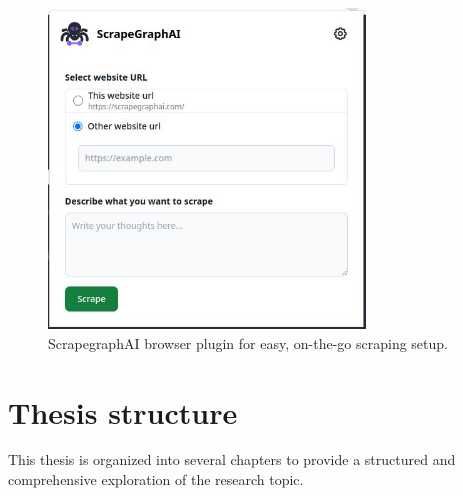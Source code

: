 \begin{figure}[h!]
    \centering
    \includegraphics[width=0.75\textwidth]{Assets/tool.jpg}
    \caption{ScrapegraphAI browser plugin for easy, on-the-go scraping setup.}
    \label{fig:browser-plugin}
\end{figure}

\newpage

\section{Thesis structure}
This thesis is organized into several chapters to provide a structured and comprehensive exploration of the research topic.

